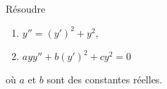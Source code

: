 

\begin{exercice}\label{exo_II-1-16}

Résoudre
\begin{enumerate}
\item $y''=(y')^2+y^2$,
\item $ayy''+b(y')^2+cy^2=0$
\end{enumerate}
où $a$ et $b$ sont des constantes réelles.

\end{exercice}
